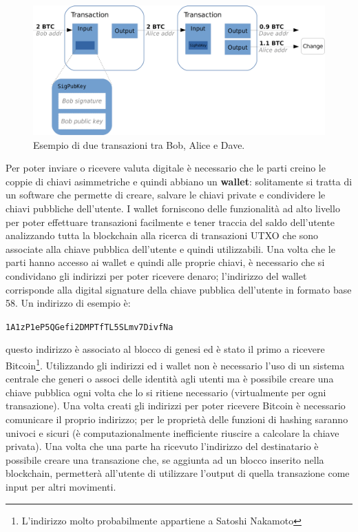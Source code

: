 \begin{enumerate}[1.]
\begin{figure}
    \centering
    \includegraphics[width=\textwidth]{./images/tx-schema.png}
    \caption{Esempio di due transazioni tra Bob, Alice e Dave.}
    \label{fig:tx}
\end{figure}
Per poter inviare o ricevere valuta digitale è necessario che le parti creino le coppie di chiavi asimmetriche e quindi abbiano un \textbf{wallet}: solitamente si tratta di un software che permette di creare, salvare le chiavi private e condividere le chiavi pubbliche dell'utente.\newline
I wallet forniscono delle funzionalità ad alto livello per poter effettuare transazioni facilmente e tener traccia del saldo dell'utente analizzando tutta la blockchain alla ricerca di transazioni UTXO che sono associate alla chiave pubblica dell'utente e quindi utilizzabili.\newline
Una volta che le parti hanno accesso ai wallet e quindi alle proprie chiavi, è necessario che si condividano gli indirizzi per poter ricevere denaro; l'indirizzo del wallet corrisponde alla digital signature della chiave pubblica dell'utente in formato base 58.\newline
Un indirizzo di esempio è:
\begin{itemize}
    \centering
    \texttt{1A1zP1eP5QGefi2DMPTfTL5SLmv7DivfNa}
\end{itemize}
questo indirizzo è associato al blocco di genesi ed è stato il primo a ricevere Bitcoin\footnote{L'indirizzo molto probabilmente appartiene a Satoshi Nakamoto}.\newline
Utilizzando gli indirizzi ed i wallet non è necessario l'uso di un sistema centrale che generi o associ delle identità agli utenti ma è possibile creare una chiave pubblica ogni volta che lo si ritiene necessario (virtualmente per ogni transazione).\newline
Una volta creati gli indirizzi per poter ricevere Bitcoin è necessario comunicare il proprio indirizzo; per le proprietà delle funzioni di hashing saranno univoci e sicuri (è computazionalmente inefficiente riuscire a calcolare la chiave privata). Una volta che una parte ha ricevuto l'indirizzo del destinatario è possibile creare una transazione che, se aggiunta ad un blocco inserito nella blockchain, permetterà all'utente di utilizzare l'output di quella transazione come input per altri movimenti.\newline

\end{enumerate}
